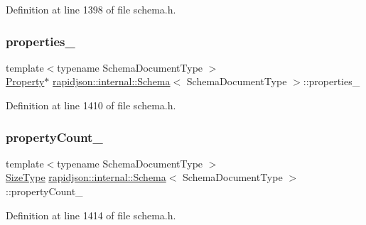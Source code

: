 Definition at line 1398 of file schema.\+h.

\mbox{\label{classrapidjson_1_1internal_1_1_schema_aa2a4a4d8e178fba11d251cf1a5556764}} 
\subsubsection{\texorpdfstring{properties\_}{properties\_}}
{\footnotesize\ttfamily template$<$typename Schema\+Document\+Type $>$ \\
\mbox{\hyperlink{structrapidjson_1_1internal_1_1_schema_1_1_property}{Property}}$\ast$ \mbox{\hyperlink{classrapidjson_1_1internal_1_1_schema}{rapidjson\+::internal\+::\+Schema}}$<$ Schema\+Document\+Type $>$\+::properties\+\_\+\hspace{0.3cm}{\ttfamily [private]}}



Definition at line 1410 of file schema.\+h.

\mbox{\label{classrapidjson_1_1internal_1_1_schema_a9f6ce8607cea323c9b63669b02308262}} 
\subsubsection{\texorpdfstring{propertyCount\_}{propertyCount\_}}
{\footnotesize\ttfamily template$<$typename Schema\+Document\+Type $>$ \\
\mbox{\hyperlink{namespacerapidjson_a44eb33eaa523e36d466b1ced64b85c84}{Size\+Type}} \mbox{\hyperlink{classrapidjson_1_1internal_1_1_schema}{rapidjson\+::internal\+::\+Schema}}$<$ Schema\+Document\+Type $>$\+::property\+Count\+\_\+\hspace{0.3cm}{\ttfamily [private]}}



Definition at line 1414 of file schema.\+h.

